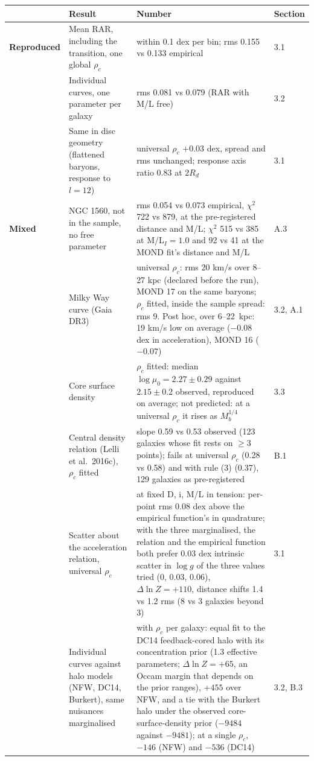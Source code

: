 \documentclass[
  10pt,
]{article}
\begin{document}
{\small
\begin{longtable}[]{@{}>{\raggedright\arraybackslash}p{2.4cm}p{5.6cm}p{5.5cm}p{1.5cm}@{}}
\toprule
 & Result & Number & Section\tabularnewline
\midrule
\endhead
\textbf{Reproduced} & Mean RAR, including the transition, one global $\rho_c$ & within 0.1 dex per bin; rms 0.155 vs 0.133 empirical & 3.1\tabularnewline\addlinespace[5pt]
 & Individual curves, one parameter per galaxy & rms 0.081 vs 0.079 (RAR with M/L free) & 3.2\tabularnewline\addlinespace[5pt]
 & Same in disc geometry (flattened baryons, response to $l=12$) & universal $\rho_c$ $+0.03$ dex, spread and rms unchanged; response axis ratio 0.83 at $2R_d$ & 3.1\tabularnewline
\midrule
\textbf{Mixed} & NGC 1560, not in the sample, no free parameter & rms 0.054 vs 0.073 empirical, $\chi^2$ 722 vs 879, at the pre-registered distance and M/L; $\chi^2$ 515 vs 385 at M/L$_I=1.0$ and 92 vs 41 at the MOND fit's distance and M/L & A.3\tabularnewline\addlinespace[5pt]
 & Milky Way curve (Gaia DR3) & universal $\rho_c$: rms 20 km/s over 8--27 kpc (declared before the run), MOND 17 on the same baryons; $\rho_c$ fitted, inside the sample spread: rms 9. Post hoc, over \mbox{6--22 kpc}: 19 km/s low on average ($-0.08$ dex in acceleration), MOND 16 ($-0.07$) & 3.2, A.1\tabularnewline\addlinespace[5pt]
 & Core surface density & $\rho_c$ fitted: median $\log\mu_0=2.27\pm0.29$ against $2.15\pm0.2$ observed, reproduced on average; not predicted: at a universal $\rho_c$ it rises as $M_b^{1/4}$ & 3.3\tabularnewline\addlinespace[5pt]
 & Central density relation (Lelli et al.~2016c), $\rho_c$ fitted & slope 0.59 vs 0.53 observed (123 galaxies whose fit rests on $\geq3$ points); fails at universal $\rho_c$ (0.28 vs 0.58) and with rule (3) (0.37), 129 galaxies as pre-registered & B.1\tabularnewline\addlinespace[5pt]
 & Scatter about the acceleration relation, universal $\rho_c$ & at fixed D, i, M/L in tension: per-point rms 0.08 dex above the empirical function's in quadrature; with the three marginalised, the relation and the empirical function both prefer 0.03 dex intrinsic scatter in $\log g$ of the three values tried (0, 0.03, 0.06), $\Delta\ln Z=+110$, distance shifts 1.4 vs 1.2 rms (8 vs 3 galaxies beyond 3) & 3.1\tabularnewline\addlinespace[5pt]
 & Individual curves against halo models (NFW, DC14, Burkert), same nuisances marginalised & with $\rho_c$ per galaxy: equal fit to the DC14 feedback-cored halo with its concentration prior (1.3 effective parameters; $\Delta\ln Z=+65$, an Occam margin that depends on the prior ranges), $+455$ over NFW, and a tie with the Burkert halo under the observed core-surface-density prior ($-9484$ against $-9481$); at a single $\rho_c$, $-146$ (NFW) and $-536$ (DC14) & 3.2, B.3\tabularnewline

\end{longtable}}
\end{document}
